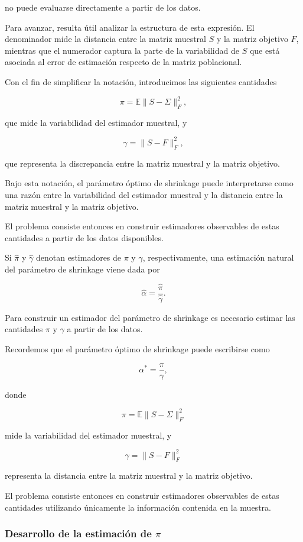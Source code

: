 \documentclass[letterpaper,12pt,oneside]{book}
\begin{document}
no puede evaluarse directamente a partir de los datos.

Para avanzar, resulta útil analizar la estructura de esta expresión. El denominador mide la distancia entre la matriz muestral $S$ y la matriz objetivo $F$, mientras que el numerador captura la parte de la variabilidad de $S$ que está asociada al error de estimación respecto de la matriz poblacional.

Con el fin de simplificar la notación, introducimos las siguientes cantidades

\[
\pi
=
\mathbb{E}\|S-\Sigma\|_F^2,
\]

que mide la variabilidad del estimador muestral, y

\[
\gamma
=
\|S-F\|_F^2,
\]

que representa la discrepancia entre la matriz muestral y la matriz objetivo.

Bajo esta notación, el parámetro óptimo de shrinkage puede interpretarse como una razón entre la variabilidad del estimador muestral y la distancia entre la matriz muestral y la matriz objetivo.

El problema consiste entonces en construir estimadores observables de estas cantidades a partir de los datos disponibles.

Si $\hat{\pi}$ y $\hat{\gamma}$ denotan estimadores de $\pi$ y $\gamma$, respectivamente, una estimación natural del parámetro de shrinkage viene dada por

\[
\hat{\alpha} = \frac{\hat{\pi}}{\hat{\gamma}}.
\]

Para construir un estimador del parámetro de shrinkage es necesario estimar las cantidades $\pi$ y $\gamma$ a partir de los datos.




Recordemos que el parámetro óptimo de shrinkage puede escribirse como

\[
\alpha^* = \frac{\pi}{\gamma},
\]

donde

\[
\pi = \mathbb{E}\|S-\Sigma\|_F^2
\]

mide la variabilidad del estimador muestral, y

\[
\gamma = \|S-F\|_F^2
\]

representa la distancia entre la matriz muestral y la matriz objetivo.

El problema consiste entonces en construir estimadores observables de estas cantidades utilizando únicamente la información contenida en la muestra.

\subsubsection*{Desarrollo de la estimación de $\pi$}
\end{document}
